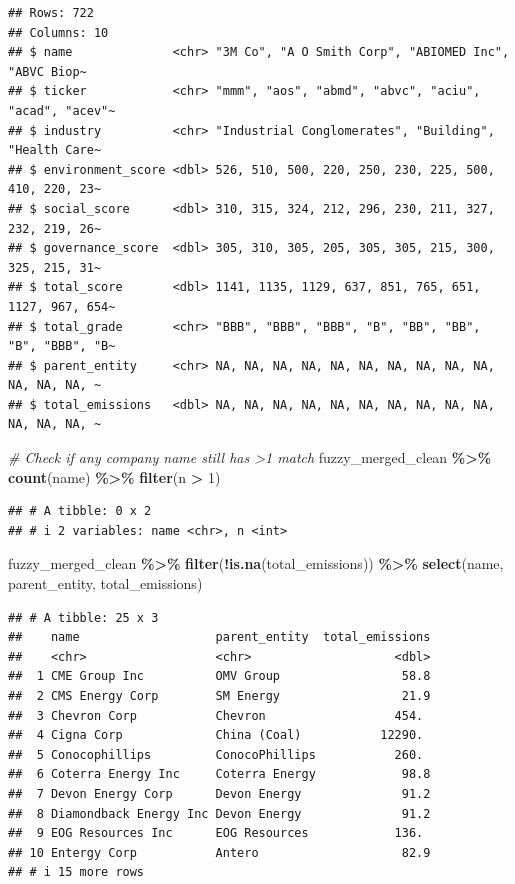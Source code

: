 \documentclass[
]{article}
\newenvironment{Shaded}{\begin{snugshade}}{\end{snugshade}}
\newcommand{\CommentTok}[1]{\textcolor[rgb]{0.56,0.35,0.01}{\textit{#1}}}
\newcommand{\DecValTok}[1]{\textcolor[rgb]{0.00,0.00,0.81}{#1}}
\newcommand{\FunctionTok}[1]{\textcolor[rgb]{0.13,0.29,0.53}{\textbf{#1}}}
\newcommand{\NormalTok}[1]{#1}
\newcommand{\SpecialCharTok}[1]{\textcolor[rgb]{0.81,0.36,0.00}{\textbf{#1}}}
\begin{document}
\begin{verbatim}
## Rows: 722
## Columns: 10
## $ name              <chr> "3M Co", "A O Smith Corp", "ABIOMED Inc", "ABVC Biop~
## $ ticker            <chr> "mmm", "aos", "abmd", "abvc", "aciu", "acad", "acev"~
## $ industry          <chr> "Industrial Conglomerates", "Building", "Health Care~
## $ environment_score <dbl> 526, 510, 500, 220, 250, 230, 225, 500, 410, 220, 23~
## $ social_score      <dbl> 310, 315, 324, 212, 296, 230, 211, 327, 232, 219, 26~
## $ governance_score  <dbl> 305, 310, 305, 205, 305, 305, 215, 300, 325, 215, 31~
## $ total_score       <dbl> 1141, 1135, 1129, 637, 851, 765, 651, 1127, 967, 654~
## $ total_grade       <chr> "BBB", "BBB", "BBB", "B", "BB", "BB", "B", "BBB", "B~
## $ parent_entity     <chr> NA, NA, NA, NA, NA, NA, NA, NA, NA, NA, NA, NA, NA, ~
## $ total_emissions   <dbl> NA, NA, NA, NA, NA, NA, NA, NA, NA, NA, NA, NA, NA, ~
\end{verbatim}

\begin{Shaded}
\begin{Highlighting}[]
\CommentTok{\# Check if any company name still has \textgreater{}1 match}
\NormalTok{fuzzy\_merged\_clean }\SpecialCharTok{\%\textgreater{}\%}
  \FunctionTok{count}\NormalTok{(name) }\SpecialCharTok{\%\textgreater{}\%}
  \FunctionTok{filter}\NormalTok{(n }\SpecialCharTok{\textgreater{}} \DecValTok{1}\NormalTok{)}
\end{Highlighting}
\end{Shaded}

\begin{verbatim}
## # A tibble: 0 x 2
## # i 2 variables: name <chr>, n <int>
\end{verbatim}

\begin{Shaded}
\begin{Highlighting}[]
\NormalTok{fuzzy\_merged\_clean }\SpecialCharTok{\%\textgreater{}\%}
  \FunctionTok{filter}\NormalTok{(}\SpecialCharTok{!}\FunctionTok{is.na}\NormalTok{(total\_emissions)) }\SpecialCharTok{\%\textgreater{}\%}
  \FunctionTok{select}\NormalTok{(name, parent\_entity, total\_emissions)}
\end{Highlighting}
\end{Shaded}

\begin{verbatim}
## # A tibble: 25 x 3
##    name                   parent_entity  total_emissions
##    <chr>                  <chr>                    <dbl>
##  1 CME Group Inc          OMV Group                 58.8
##  2 CMS Energy Corp        SM Energy                 21.9
##  3 Chevron Corp           Chevron                  454. 
##  4 Cigna Corp             China (Coal)           12290. 
##  5 Conocophillips         ConocoPhillips           260. 
##  6 Coterra Energy Inc     Coterra Energy            98.8
##  7 Devon Energy Corp      Devon Energy              91.2
##  8 Diamondback Energy Inc Devon Energy              91.2
##  9 EOG Resources Inc      EOG Resources            136. 
## 10 Entergy Corp           Antero                    82.9
## # i 15 more rows
\end{verbatim}
\end{document}
